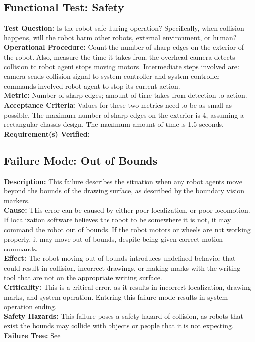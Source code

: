 \subsection{Functional Test: Safety}
\label{test:sys_ft_safety}
\textbf{Test Question:} Is the robot safe during operation? Specifically, when collision happens, will the robot harm other robots, external environment, or human?\\
\textbf{Operational Procedure:} Count the number of sharp edges on the exterior of the robot. Also, measure the time it takes from the overhead camera detects collision to robot agent stops moving motors. Intermediate steps involved are: camera sends collision signal to system controller and system controller commands involved robot agent to stop its current action. \\
\textbf{Metric:} Number of sharp edges; amount of time takes from detection to action.\\
\textbf{Acceptance Criteria:} Values for these two metrics need to be as small as possible. The maximum number of sharp edges on the exterior is 4, assuming a rectangular chassis design. The maximum amount of time is 1.5 seconds. \\
\textbf{Requirement(s) Verified:} 

\subsection{Failure Mode: Out of Bounds}
\label{sec:sys_val_fm_bounds}
\textbf{Description:} This failure describes the situation when any robot agents move beyond the bounds of the drawing surface, as described by the boundary vision markers.\\
\textbf{Cause:} This error can be caused by either poor localization, or poor locomotion. If localization software believes the robot to be somewhere it is not, it may command the robot out of bounds. If the robot motors or wheels are not working properly, it may move out of bounds, despite being given correct motion commands.\\
\textbf{Effect:} The robot moving out of bounds introduces undefined behavior that could result in collision, incorrect drawings, or making marks with the writing tool that are not on the appropriate writing surface.\\
\textbf{Criticality:} This is a critical error, as it results in incorrect localization, drawing marks, and system operation. Entering this failure mode results in system operation ending.\\
\textbf{Safety Hazards:} This failure poses a safety hazard of collision, as robots that exist the bounds may collide with objects or people that it is not expecting.\\
\textbf{Failure Tree:} See 

